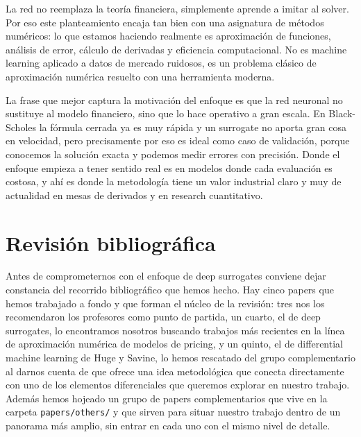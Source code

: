 \documentclass[11pt,a4paper]{article}
\begin{document}
La red no reemplaza la teoría financiera, simplemente aprende a imitar al solver. Por eso este planteamiento encaja tan bien con una asignatura de métodos numéricos: lo que estamos haciendo realmente es aproximación de funciones, análisis de error, cálculo de derivadas y eficiencia computacional. No es machine learning aplicado a datos de mercado ruidosos, es un problema clásico de aproximación numérica resuelto con una herramienta moderna.

La frase que mejor captura la motivación del enfoque es que la red neuronal no sustituye al modelo financiero, sino que lo hace operativo a gran escala. En Black-Scholes la fórmula cerrada ya es muy rápida y un surrogate no aporta gran cosa en velocidad, pero precisamente por eso es ideal como caso de validación, porque conocemos la solución exacta y podemos medir errores con precisión. Donde el enfoque empieza a tener sentido real es en modelos donde cada evaluación es costosa, y ahí es donde la metodología tiene un valor industrial claro y muy de actualidad en mesas de derivados y en research cuantitativo.

\section*{Revisión bibliográfica}

Antes de comprometernos con el enfoque de deep surrogates conviene dejar constancia del recorrido bibliográfico que hemos hecho. Hay cinco papers que hemos trabajado a fondo y que forman el núcleo de la revisión: tres nos los recomendaron los profesores como punto de partida, un cuarto, el de deep surrogates, lo encontramos nosotros buscando trabajos más recientes en la línea de aproximación numérica de modelos de pricing, y un quinto, el de differential machine learning de Huge y Savine, lo hemos rescatado del grupo complementario al darnos cuenta de que ofrece una idea metodológica que conecta directamente con uno de los elementos diferenciales que queremos explorar en nuestro trabajo. Además hemos hojeado un grupo de papers complementarios que vive en la carpeta \texttt{papers/others/} y que sirven para situar nuestro trabajo dentro de un panorama más amplio, sin entrar en cada uno con el mismo nivel de detalle.
\end{document}
